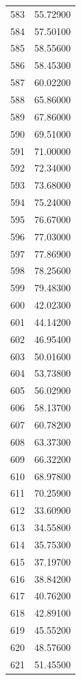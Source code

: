 \documentclass[
  letterpaper,
  DIV=11,
  numbers=noendperiod]{scrreprt}
\begin{document}
\begin{tcolorbox}
\begin{tabular}{lr}
583  &         55.72900 \\
584  &         57.50100 \\
585  &         58.55600 \\
586  &         58.45300 \\
587  &         60.02200 \\
588  &         65.86000 \\
589  &         67.86000 \\
590  &         69.51000 \\
591  &         71.00000 \\
592  &         72.34000 \\
593  &         73.68000 \\
594  &         75.24000 \\
595  &         76.67000 \\
596  &         77.03000 \\
597  &         77.86900 \\
598  &         78.25600 \\
599  &         79.48300 \\
600  &         42.02300 \\
601  &         44.14200 \\
602  &         46.95400 \\
603  &         50.01600 \\
604  &         53.73800 \\
605  &         56.02900 \\
606  &         58.13700 \\
607  &         60.78200 \\
608  &         63.37300 \\
609  &         66.32200 \\
610  &         68.97800 \\
611  &         70.25900 \\
612  &         33.60900 \\
613  &         34.55800 \\
614  &         35.75300 \\
615  &         37.19700 \\
616  &         38.84200 \\
617  &         40.76200 \\
618  &         42.89100 \\
619  &         45.55200 \\
620  &         48.57600 \\
621  &         51.45500 \\

\end{tabular}
\end{tcolorbox}
\end{document}
